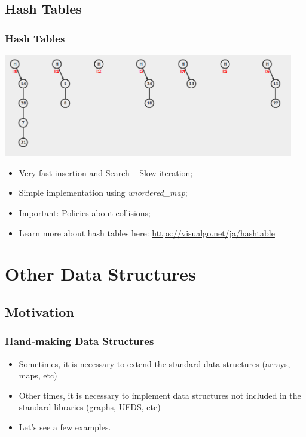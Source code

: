 \documentclass{beamer}
\begin{document}
\subsection{Hash Tables}
\begin{frame}[fragile]
  \frametitle{Hash Tables}

  \includegraphics[width=0.95\textwidth]{img/hash}

  \begin{itemize}
  \item Very fast insertion and Search -- Slow iteration;
  \item Simple implementation using \emph{unordered\_map};
  \item Important: Policies about collisions;
  \item Learn more about hash tables here: \url{https://visualgo.net/ja/hashtable}
  \end{itemize}
\end{frame}

\section{Other Data Structures}
\subsection{Motivation}
\begin{frame}
  \frametitle{Hand-making Data Structures}

  \begin{itemize}
  \item Sometimes, it is necessary to extend the standard data structures
    (arrays, maps, etc)
    \bigskip

  \item Other times, it is necessary to implement data structures not
    included in the standard libraries (graphs, UFDS, etc)
    \bigskip

  \item Let's see a few examples.
  \end{itemize}
\end{frame}
\end{document}
